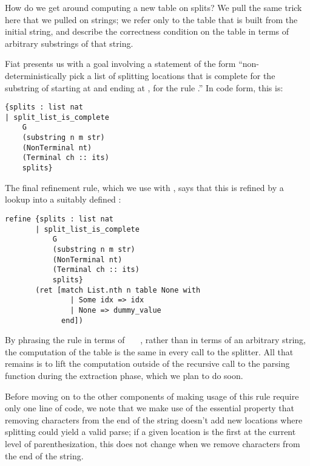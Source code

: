       How do we get around computing a new table on splits?  We pull the same trick here that we pulled on strings; we refer only to the table that is built from the initial string, and describe the correctness condition on the table in terms of arbitrary substrings of that string.
      
      Fiat presents us with a goal involving a statement of the form ``non-deterministically pick a list of splitting locations that is complete for the substring of  starting at  and ending at , for the rule .''  In code form, this is:
\begin{verbatim}
{splits : list nat
| split_list_is_complete
    G
    (substring n m str)
    (NonTerminal nt)
    (Terminal ch :: its)
    splits}
\end{verbatim}
    
    The final refinement rule, which we use with , says that this is refined by a lookup into a suitably defined :
\begin{verbatim}
refine {splits : list nat
       | split_list_is_complete
           G
           (substring n m str)
           (NonTerminal nt)
           (Terminal ch :: its)
           splits}
       (ret [match List.nth n table None with
               | Some idx => idx
               | None => dummy_value
             end])
\end{verbatim}

    By phrasing the rule in terms of ~~~, rather than in terms of an arbitrary string, the computation of the table is the same in every call to the splitter.  All that remains is to lift the computation outside of the recursive call to the parsing function during the extraction phase, which we plan to do soon. 
    
    Before moving on to the other components of making usage of this rule require only one line of code, we note that we make use of the essential property that removing characters from the end of the string doesn't add new locations where splitting could yield a valid parse; if a given location is the first \terminal{+} at the current level of parenthesization, this does not change when we remove characters from the end of the string.  
    
